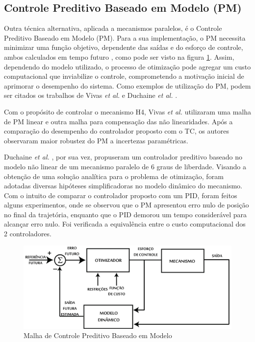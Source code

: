 \documentclass[]{politex}
\begin{document}
\subsection{Controle Preditivo Baseado em Modelo (PM)}

Outra técnica alternativa, aplicada a mecanismos paralelos, é o Controle Preditivo Baseado em Modelo (PM). Para a sua implementação, o PM necessita minimizar uma função objetivo, dependente das saídas e do esforço de controle, ambos calculados em tempo futuro \cite{Camacho}, como pode ser visto na figura \ref{fig:CPM}. Assim, dependendo do modelo utilizado, o processo de otimização pode agregar um custo computacional que inviabilize o controle, comprometendo a motivação inicial de aprimorar o desempenho do sistema. Como exemplos de utilização do PM, podem ser citados os trabalhos de Vivas \emph{et al.} \cite{Vivas} e   Duchaine \emph{et al.} \cite{Duchaine}.

Com o propósito de controlar o mecanismo H4, Vivas \emph{et al.} \cite{Vivas} utilizaram  uma malha de PM linear e outra malha para compensação das não linearidades. Após a comparação do desempenho do controlador proposto com  o TC, os autores observaram maior robustez do PM a incertezas paramétricas. 

Duchaine \emph{et al.} \cite{Duchaine}, por sua vez, propuseram um controlador preditivo baseado no modelo não linear de um mecanismo paralelo de 6 graus de liberdade. Visando a obtenção de uma solução analítica para o problema de otimização, foram adotadas diversas hipóteses simplificadoras no modelo dinâmico do mecanismo. Com o intuito de comparar o controlador proposto com um PID, foram feitos alguns experimentos, onde se observou  que o PM apresentou erro nulo de posição no final da trajetória, enquanto que o PID demorou um tempo considerável para alcançar erro nulo. Foi verificada a equivalência entre o custo computacional dos 2 controladores. 

\begin{figure}[h]
	\centering
	\includegraphics[scale=0.11]{../figures/CPM.jpg}  
	\caption{Malha de Controle Preditivo Baseado em Modelo}
	\label{fig:CPM}
\end{figure}
\end{document}
